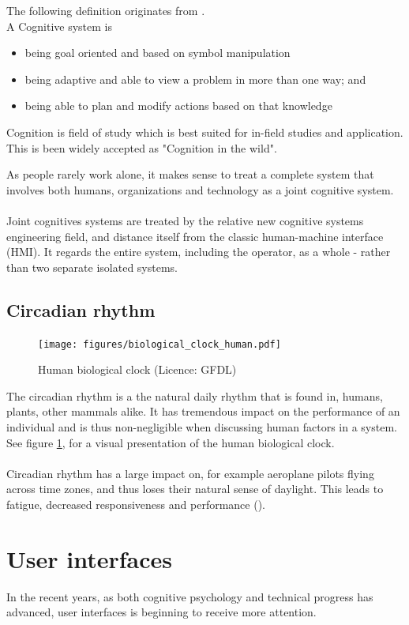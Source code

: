 \documentclass[10pt,oneside]{book}                  %
\begin{document}
The following definition originates from \cite{hollnagel2005joint}.\\
A Cognitive system is
\begin{itemize}
  \item being goal oriented and based on symbol manipulation
  \item being adaptive and able to view a problem in more than one way; and
  \item being able to plan and modify actions based on that knowledge
\end{itemize}
Cognition is field of study which is best suited for in-field studies and application. This is been widely accepted as "Cognition in the wild".

As people rarely work alone, it makes sense to treat a complete system that involves both humans, organizations and technology as a joint cognitive system. \cite{hollnagel2005joint}\\
\\
Joint cognitives systems are treated by the relative new cognitive systems engineering field, and distance itself from the classic human-machine interface (HMI). It regards the entire system, including the operator, as a whole - rather than two separate isolated systems.
\subsection{Circadian rhythm}
\begin{figure}[h]
 \centering
   \texttt{[image: figures/biological\_clock\_human.pdf]}
 \caption{Human biological clock (Licence: GFDL)}
 \label{fig:human_biological_clock}
\end{figure}
The circadian rhythm is a the natural daily rhythm that is found in, humans, plants, other mammals alike. It has tremendous impact on the performance of an individual and is thus non-negligible when discussing human factors in a system. See figure \ref{fig:human_biological_clock}, for a visual presentation of the human biological clock.\\
\\
Circadian rhythm has a large impact on, for example aeroplane pilots flying across time zones, and thus loses their natural sense of daylight. This leads to fatigue, decreased responsiveness and performance (\cite{mallis2010aircrew}).


\section{User interfaces}
In the recent years, as both cognitive psychology and technical progress has advanced, user interfaces is beginning to receive more attention. 
\end{document}
